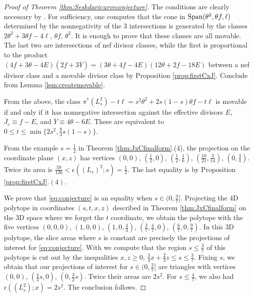 \documentclass[12pt]{amsart}
\theoremstyle{definition}
\renewcommand{\geq}{\geqslant}
\renewcommand{\leq}{\leqslant}
\newcommand{\?}{ \circled{{\large\bf ?}}}
\begin{document}
\begin{proof}[Proof of {Theorem \ref{thm:Seshdaricurveconjecture}}]
The conditions are clearly necessary by \cite{BDPP}. 
For sufficiency, one computes that the cone in ${\rm Span}(\theta^2,\theta f,\ell)$ determined by the nonnegativity of the 3 intersections is generated by the classes $2\theta^2+3\theta f-4\ell$, $\theta f$, $\theta^2$. It is enough to prove that these classes are all movable. The last two are intersections of nef divisor classes, while the first is proportional to the product $(4f+3\theta-4E)(2f+3\overline Y)=(3\theta+4f-4E)(12\theta+2f-18E)$ between a nef divisor class and a movable divisor class by Proposition \ref{prop:firstCxJ}. Conclude from Lemma \ref{lem:createmovable}.

From the above, the class $\pi^*(L_s^2)-t\ell=s^2\theta^2+2s(1-s)\theta f-t\ell$ is movable if and only if it has nonnegative intersection against the effective divisors $E$, $\overline J_c\equiv f-E$, and $\overline Y\equiv 4\theta-6E$. These are equivalent to $0\leq t\leq\min\{2s^2,\frac 83s(1-s)\}$. 	

From the example $s=\frac 12$ in Theorem \ref{thm:JxCfinalform}.(4), the projection on the coordinate plane $(x,z)$ has vertices $(0,0)$, $(\frac 12,0)$, $(\frac 12,\frac 16)$, $(\frac{10}{21},\frac 3{14})$, $(0,\frac 34)$. Twice its area is $\frac{59}{126}<\epsilon((L_s)^2;s)=\frac 12$. The last equality is by Proposition \ref{prop:firstCxJ}.$(4)$.

We prove that \eqref{eq:conjecture} is an equality when $s\in(0,\frac 37]$.
Projecting the 4D polytope in coordinates $(s,t,x,z)$ described in Theorem \ref{thm:JxCfinalform} on the 3D space where we forget the $t$ coordinate, we obtain the polytope with the five vertices $(0,0,0)$, $(1,0,0)$, $(1,0,\frac 43)$, $(\frac 37,\frac 47,0)$, $(\frac 67,0,\frac 97)$. In this 3D polytope, the slice areas where $s$ is constant are precisely the projections of interest for \eqref{eq:conjecture}.
With \cite{Polymake} we compute that the region $s\leq\frac 37$ of this polytope is cut out by the inequalities $x,z\geq 0$, $\frac 34x+\frac 23z\leq s\leq\frac 37$. Fixing $s$, we obtain that our projections of interest for $s\in(0,\frac 37]$ are triangles with vertices $(0,0)$, $(\frac 43s,0)$, $(0,\frac 32s)$. Twice their areas are $2s^2$. For $s\leq\frac 47$, we also had $\epsilon((L_s^2);x)=2s^2$. The conclusion follows.
\end{proof} 
\end{document}
